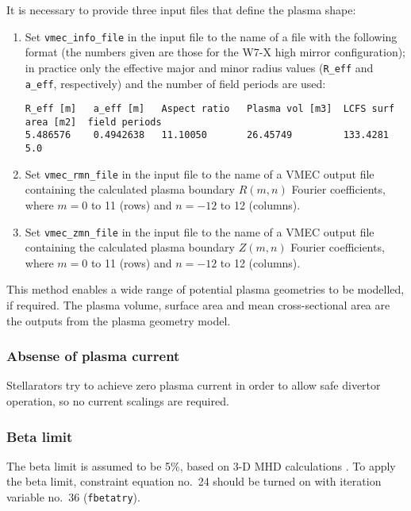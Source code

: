 \documentclass[11pt,a4paper]{report}
\begin{document}
It is necessary to provide three input files that define the plasma shape:
\begin{enumerate}

\item Set \texttt{vmec\_info\_file} in the input file to the name of a file
  with the following format (the numbers given are those for the W7-X high
  mirror configuration); in practice only the effective major and minor radius
  values (\texttt{R\_eff} and \texttt{a\_eff}, respectively) and the number of
  field periods are used:

\footnotesize
\begin{verbatim}
R_eff [m]   a_eff [m]   Aspect ratio   Plasma vol [m3]  LCFS surf area [m2]  field periods
5.486576    0.4942638   11.10050       26.45749         133.4281             5.0
\end{verbatim}
\normalsize

\item Set \texttt{vmec\_rmn\_file} in the input file to the name of a VMEC
  output file containing the calculated plasma boundary $R(m,n)$ Fourier
  coefficients, where $m = 0$ to 11 (rows) and $n = -12$ to 12 (columns).

\item Set \texttt{vmec\_zmn\_file} in the input file to the name of a VMEC
  output file containing the calculated plasma boundary $Z(m,n)$ Fourier
  coefficients, where $m = 0$ to 11 (rows) and $n = -12$ to 12 (columns).

\end{enumerate}

This method enables a wide range of potential plasma geometries to be
modelled, if required. The plasma volume, surface area and mean
cross-sectional area are the outputs from the plasma geometry model.

\subsubsection{Absense of plasma current}

Stellarators try to achieve zero plasma current in order to allow safe
divertor operation, so no current scalings are required.

\subsubsection{Beta limit}

The beta limit is assumed to be 5\%, based on 3-D MHD calculations
\cite{Nuhrenberg}. To apply the beta limit, constraint equation no.\ 24 should
be turned on with iteration variable no.\ 36 (\texttt{fbetatry}).
\end{document}
